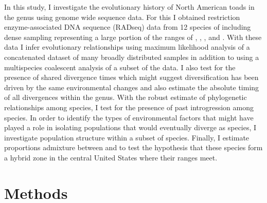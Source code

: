 

In this study, I investigate the evolutionary history of North American
toads in the genus \anaxyrus using genome wide sequence data. 
For this I obtained restriction enzyme-associated DNA sequence (RADseq) data
from 12 species of \anaxyrus including dense sampling representing a 
large portion of the ranges of \amer, \fowl, \terr, and \wood.
With these data I infer evolutionary relationships using maximum likelihood analysis  
of a concatenated dataset of many broadly distributed samples in addition to 
using a multispecies coalescent analysis of a subset of the data.
I also test for the presence of shared divergence times which might suggest
\anaxyrus diversification has been driven by the same environmental changes
and also estimate the absolute timing of all divergences within the genus.
With the robust estimate of phylogenetic relationships among \anaxyrus species, 
I test for the presence of past introgression among species.
In order to identify the types of environmental factors that might have played
a role in isolating populations that would eventually diverge as species,
I investigate population structure within a subset of \anaxyrus species.
Finally, I estimate proportions admixture between \fowl and \wood to test
the hypothesis that these species form a hybrid zone in the central United  
States where their ranges meet.



\section{Methods}
